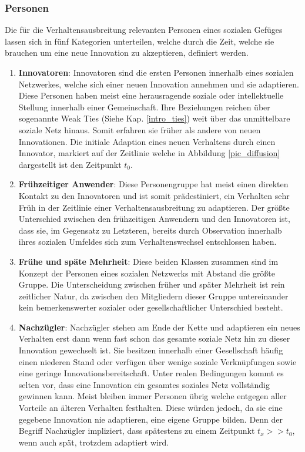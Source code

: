 \documentclass[12pt]{article}
\begin{document}
\subsubsection{Personen}
Die für die Verhaltensausbreitung relevanten Personen eines sozialen Gefüges lassen sich in fünf Kategorien unterteilen, welche durch die Zeit, welche sie brauchen um eine neue Innovation zu akzeptieren, definiert werden. \cite{Rogers03}
\begin{enumerate}
\item \textbf{Innovatoren}: Innovatoren sind die ersten Personen innerhalb eines sozialen Netzwerkes, welche sich einer neuen Innovation annehmen und sie adaptieren. Diese Personen haben meist eine herausragende soziale oder intellektuelle Stellung innerhalb einer Gemeinschaft. Ihre Beziehungen reichen über sogenannte Weak Ties (Siehe Kap. \ref{intro_ties}) weit über das unmittelbare soziale Netz hinaus. Somit erfahren sie früher als andere von neuen Innovationen. Die initiale Adaption eines neuen Verhaltens durch einen Innovator, markiert auf der Zeitlinie welche in Abbildung \ref{pic_diffusion} dargestellt ist den Zeitpunkt $t_0$.
\item \textbf{Frühzeitiger Anwender}: Diese Personengruppe hat meist einen direkten Kontakt zu den Innovatoren und ist somit prädestiniert, ein Verhalten sehr Früh in der Zeitlinie einer Verhaltensausbreitung zu adaptieren. Der größte Unterschied zwischen den frühzeitigen Anwendern und den Innovatoren ist, dass sie, im Gegensatz zu Letzteren, bereits durch Observation innerhalb ihres sozialen Umfeldes sich zum Verhaltenswechsel entschlossen haben.
\item \textbf{Frühe und späte Mehrheit}: Diese beiden Klassen zusammen sind im Konzept der Personen eines sozialen Netzwerks mit Abstand die größte Gruppe. Die Unterscheidung zwischen früher und später Mehrheit ist rein zeitlicher Natur, da zwischen den Mitgliedern dieser Gruppe untereinander kein bemerkenswerter sozialer oder gesellschaftlicher Unterschied besteht.
\item \textbf{Nachzügler}: Nachzügler stehen am Ende der Kette und adaptieren ein neues Verhalten erst dann wenn fast schon das gesamte soziale Netz hin zu dieser Innovation gewechselt ist. Sie besitzen innerhalb einer Gesellschaft häufig einen niederen Stand oder verfügen über wenige soziale Verknüpfungen sowie eine geringe Innovationsbereitschaft. Unter realen Bedingungen kommt es selten vor, dass eine Innovation ein gesamtes soziales Netz vollständig gewinnen kann. Meist bleiben immer Personen übrig welche entgegen aller Vorteile an älteren Verhalten festhalten. Diese würden jedoch, da sie eine gegebene Innovation nie adaptieren, eine eigene Gruppe bilden. Denn der Begriff Nachzügler impliziert, dass spätestens zu einem Zeitpunkt $t_x >> t_0$, wenn auch spät, trotzdem adaptiert wird.
\end{enumerate}
\end{document}
